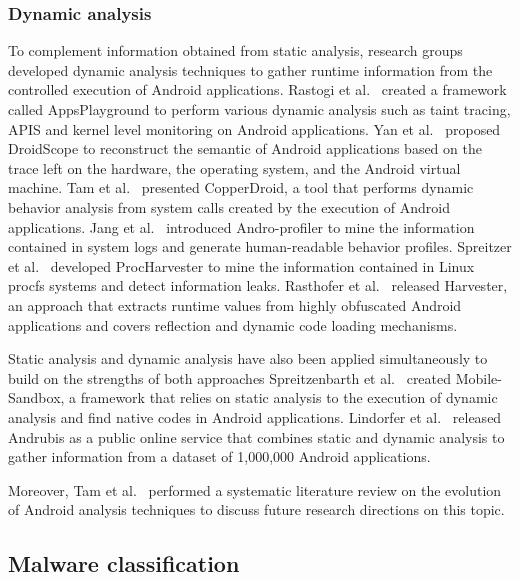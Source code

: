 \subsubsection{Dynamic analysis}
To complement information obtained from static analysis, research groups developed dynamic analysis techniques to gather runtime information from the controlled execution of Android applications.
Rastogi et al.~\cite{rastogi_appsplayground:_2013} created a framework called AppsPlayground to perform various dynamic analysis such as taint tracing, APIS and kernel level monitoring on Android applications.
Yan et al.~\cite{yan_droidscope:_2012} proposed DroidScope to reconstruct the semantic of Android applications based on the trace left on the hardware, the operating system, and the Android virtual machine.
Tam et al.~\cite{tam_copperdroid:_2015} presented CopperDroid, a tool that performs dynamic behavior analysis from system calls created by the execution of Android applications.
Jang et al.~\cite{jang_detecting_2016} introduced Andro-profiler to mine the information contained in system logs and generate human-readable behavior profiles.
Spreitzer et al.~\cite{spreitzer_procharvester:_2018} developed ProcHarvester to mine the information contained in Linux procfs systems and detect information leaks.
Rasthofer et al.~\cite{rasthofer_harvesting_2016} released Harvester, an approach that extracts runtime values from highly obfuscated Android applications and covers reflection and dynamic code loading mechanisms.

Static analysis and dynamic analysis have also been applied simultaneously to build on the strengths of both approaches
Spreitzenbarth et al.~\cite{spreitzenbarth_mobile-sandbox:_2013} created Mobile-Sandbox, a framework that relies on static analysis to the execution of dynamic analysis and find native codes in Android applications.
Lindorfer et al.~\cite{lindorfer_andrubis_2014} released Andrubis as a public online service that combines static and dynamic analysis to gather information from a dataset of 1,000,000 Android applications.

Moreover, Tam et al.~\cite{tam_evolution_2017} performed a systematic literature review on the evolution of Android analysis techniques to discuss future research directions on this topic.
\subsection{Malware classification}
